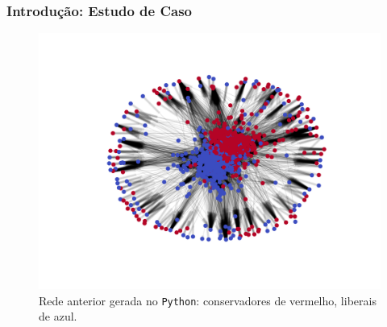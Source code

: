 \begin{frame}
  \frametitle{Introdução: Estudo de Caso}

  \begin{figure}
    \centering
    \vspace{-10mm}
    \includegraphics[scale=0.4]{./figures/99N000}
    \vspace{-5mm}
    \caption*{Rede anterior gerada no \texttt{Python}: conservadores de vermelho,
      liberais de azul.}
  \end{figure}
\end{frame}
